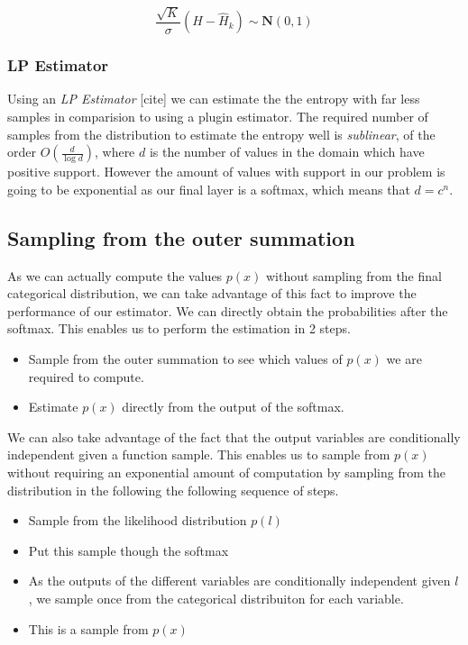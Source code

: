 \documentclass[12pt, a4paper]{report}
\theoremstyle{definition}
\theoremstyle{definition}
\theoremstyle{definition}
\begin{document}
$$ \frac{\sqrt{K}}{\sigma} \left(H - \hat{H}_k \right) \sim \mathbf{N} \left(0, 1 \right) $$



\subsubsection{LP Estimator}

Using an \textit{LP Estimator} [cite] we can estimate the the entropy with far less samples in comparision to using a plugin estimator. The required number of samples from the distribution to estimate the entropy well is \textit{sublinear}, of the order $O \left( \frac{d}{\log{d}}\right)$, where $d$ is the number of values in the domain which have positive support. However the amount of values with support in our problem is going to be exponential as our final layer is a softmax, which means that $d = c^n$.


\subsection{Sampling from the outer summation}

As we can actually compute the values $p(x)$ without sampling from the final categorical distribution, we can take advantage of this fact to improve the performance of our estimator. We can directly obtain the probabilities after the softmax. This enables us to perform the estimation in 2 steps.

\begin{itemize}
    \item Sample from the outer summation to see which values of $p(x)$ we are required to compute.
    \item Estimate $p(x)$ directly from the output of the softmax.
\end{itemize}

We can also take advantage of the fact that the output variables are conditionally independent given a function sample. This enables us to sample from $p(x)$ without requiring an exponential amount of computation by sampling from the distribution in the following the following sequence of steps.

\begin{itemize}
    \item Sample from the likelihood distribution $p(l)$
    \item Put this sample though the softmax
    \item As the outputs of the different variables are conditionally independent given $l$, we sample once from the categorical distribuiton for each variable.
    \item This is a sample from $p(x)$
\end{itemize}
\end{document}
